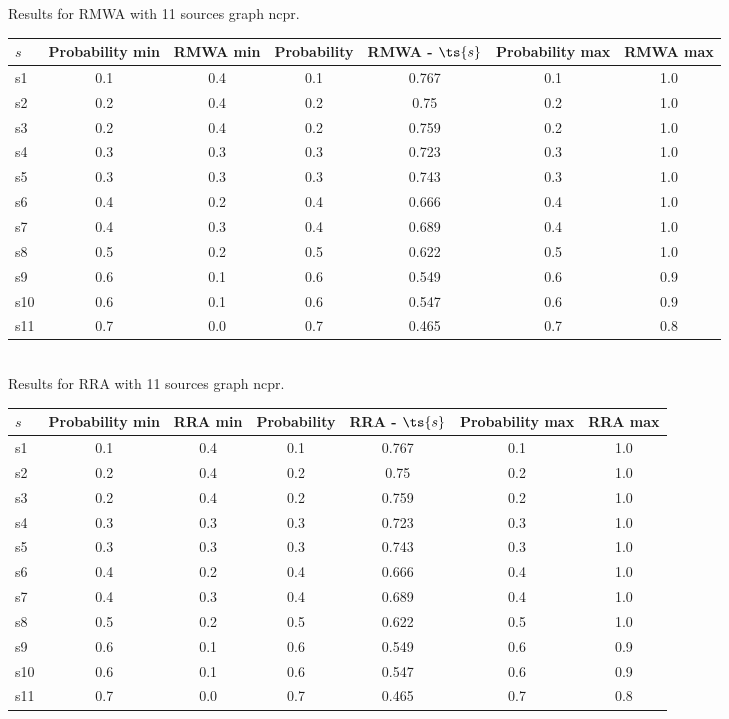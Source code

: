 \documentclass{article}
\begin{document}
\noindent Results for RMWA with 11 sources graph ncpr.

\noindent\begin{tabular}{|l|c|c|c|c|c|c|}
\hline
$s$& Probability min & RMWA min & Probability & RMWA - $\ts{s}$ & Probability max & RMWA max\\
\hline
s1 &0.1 & 0.4 & 0.1 & 0.767 & 0.1 & 1.0\\
\hline
s2 &0.2 & 0.4 & 0.2 & 0.75 & 0.2 & 1.0\\
\hline
s3 &0.2 & 0.4 & 0.2 & 0.759 & 0.2 & 1.0\\
\hline
s4 &0.3 & 0.3 & 0.3 & 0.723 & 0.3 & 1.0\\
\hline
s5 &0.3 & 0.3 & 0.3 & 0.743 & 0.3 & 1.0\\
\hline
s6 &0.4 & 0.2 & 0.4 & 0.666 & 0.4 & 1.0\\
\hline
s7 &0.4 & 0.3 & 0.4 & 0.689 & 0.4 & 1.0\\
\hline
s8 &0.5 & 0.2 & 0.5 & 0.622 & 0.5 & 1.0\\
\hline
s9 &0.6 & 0.1 & 0.6 & 0.549 & 0.6 & 0.9\\
\hline
s10 &0.6 & 0.1 & 0.6 & 0.547 & 0.6 & 0.9\\
\hline
s11 &0.7 & 0.0 & 0.7 & 0.465 & 0.7 & 0.8\\
\hline
\end{tabular}\\

\noindent Results for RRA with 11 sources graph ncpr.

\noindent\begin{tabular}{|l|c|c|c|c|c|c|}
\hline
$s$& Probability min & RRA min & Probability & RRA - $\ts{s}$ & Probability max & RRA max\\
\hline
s1 &0.1 & 0.4 & 0.1 & 0.767 & 0.1 & 1.0\\
\hline
s2 &0.2 & 0.4 & 0.2 & 0.75 & 0.2 & 1.0\\
\hline
s3 &0.2 & 0.4 & 0.2 & 0.759 & 0.2 & 1.0\\
\hline
s4 &0.3 & 0.3 & 0.3 & 0.723 & 0.3 & 1.0\\
\hline
s5 &0.3 & 0.3 & 0.3 & 0.743 & 0.3 & 1.0\\
\hline
s6 &0.4 & 0.2 & 0.4 & 0.666 & 0.4 & 1.0\\
\hline
s7 &0.4 & 0.3 & 0.4 & 0.689 & 0.4 & 1.0\\
\hline
s8 &0.5 & 0.2 & 0.5 & 0.622 & 0.5 & 1.0\\
\hline
s9 &0.6 & 0.1 & 0.6 & 0.549 & 0.6 & 0.9\\
\hline
s10 &0.6 & 0.1 & 0.6 & 0.547 & 0.6 & 0.9\\
\hline
s11 &0.7 & 0.0 & 0.7 & 0.465 & 0.7 & 0.8\\
\hline
\end{tabular}\\
\end{document}
